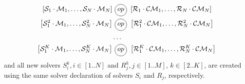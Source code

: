 \begin{align*}
\left[\mathcal{S}_1\cdot\mathcal{M}_1,\dots,\mathcal{S}_{N}\cdot\mathcal{M}_{N}\right] &\poslop{op} \left[\mathcal{R}_1\cdot\mathcal{CM}_1,\dots,\mathcal{R}_{N}\cdot\mathcal{CM}_{N}\right]\\
\left[\mathcal{S}_1^2\cdot\mathcal{M}_1,\dots,\mathcal{S}_{N}^2\cdot\mathcal{M}_{N}\right] &\poslop{op} \left[\mathcal{R}_1^2\cdot\mathcal{CM}_1,\dots,\mathcal{R}_{N}^2\cdot\mathcal{CM}_{N}\right]\\
&\dots\\
\left[\mathcal{S}_1^K\cdot\mathcal{M}_1,\dots,\mathcal{S}_{N}^K\cdot\mathcal{M}_{N}\right] &\poslop{op} \left[\mathcal{R}_1^K\cdot\mathcal{CM}_1,\dots,\mathcal{R}_{N}^K\cdot\mathcal{CM}_{N}\right]\\
\end{align*}
and all new solvers $S_i^k, i\in[1..N]$ and $R_j^k,j\in [1..M]$, $k\in[2..K]$, are created using the same solver declaration of solvers $S_i$ and $R_j$, respectively.